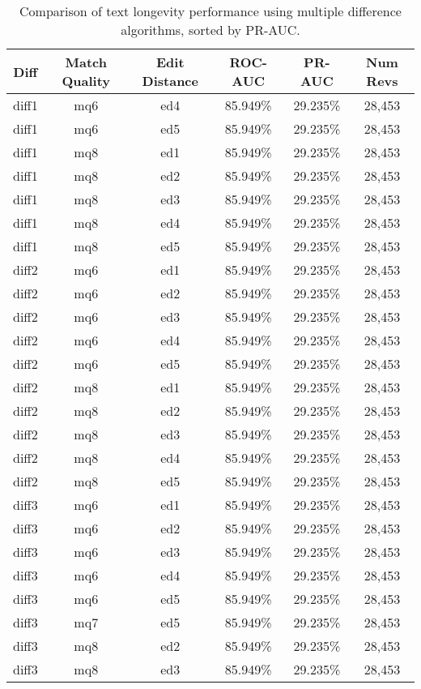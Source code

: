 \begin{table}[tbph]
\begin{center}
\begin{tabular}{|c|c|c||c|c|c|}
\hline
Diff & Match Quality & Edit Distance & ROC-AUC & PR-AUC & Num Revs \\
\hline
\hline
diff1 & mq6 & ed4 & 85.949\% & 29.235\% & 28,453 \\
diff1 & mq6 & ed5 & 85.949\% & 29.235\% & 28,453 \\
diff1 & mq8 & ed1 & 85.949\% & 29.235\% & 28,453 \\
diff1 & mq8 & ed2 & 85.949\% & 29.235\% & 28,453 \\
diff1 & mq8 & ed3 & 85.949\% & 29.235\% & 28,453 \\
diff1 & mq8 & ed4 & 85.949\% & 29.235\% & 28,453 \\
diff1 & mq8 & ed5 & 85.949\% & 29.235\% & 28,453 \\
diff2 & mq6 & ed1 & 85.949\% & 29.235\% & 28,453 \\
diff2 & mq6 & ed2 & 85.949\% & 29.235\% & 28,453 \\
diff2 & mq6 & ed3 & 85.949\% & 29.235\% & 28,453 \\
diff2 & mq6 & ed4 & 85.949\% & 29.235\% & 28,453 \\
diff2 & mq6 & ed5 & 85.949\% & 29.235\% & 28,453 \\
diff2 & mq8 & ed1 & 85.949\% & 29.235\% & 28,453 \\
diff2 & mq8 & ed2 & 85.949\% & 29.235\% & 28,453 \\
diff2 & mq8 & ed3 & 85.949\% & 29.235\% & 28,453 \\
diff2 & mq8 & ed4 & 85.949\% & 29.235\% & 28,453 \\
diff2 & mq8 & ed5 & 85.949\% & 29.235\% & 28,453 \\
diff3 & mq6 & ed1 & 85.949\% & 29.235\% & 28,453 \\
diff3 & mq6 & ed2 & 85.949\% & 29.235\% & 28,453 \\
diff3 & mq6 & ed3 & 85.949\% & 29.235\% & 28,453 \\
diff3 & mq6 & ed4 & 85.949\% & 29.235\% & 28,453 \\
diff3 & mq6 & ed5 & 85.949\% & 29.235\% & 28,453 \\
diff3 & mq7 & ed5 & 85.949\% & 29.235\% & 28,453 \\
diff3 & mq8 & ed2 & 85.949\% & 29.235\% & 28,453 \\
diff3 & mq8 & ed3 & 85.949\% & 29.235\% & 28,453 \\
\hline
\end{tabular}
\end{center}
\caption{Comparison of text longevity performance using
    multiple difference algorithms, sorted by PR-AUC.}
\label{tab:textshout}
\end{table}
